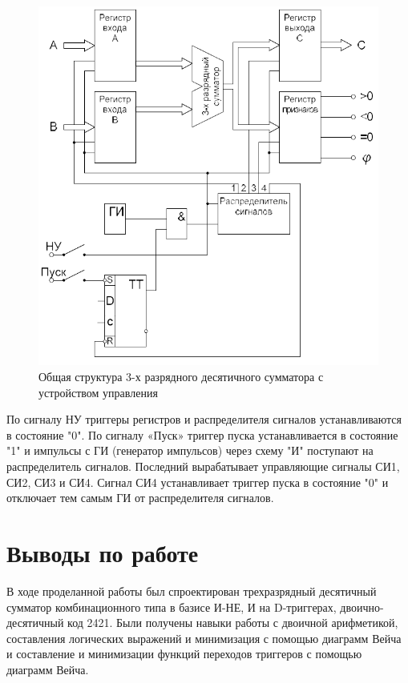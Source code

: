 \documentclass[a4paper,14pt]{article}
\begin{document}
\begin{figure}[H]
	\centering
	\includegraphics[width=1\linewidth]{images/itog_sh}
	\caption{Общая структура 3-х разрядного десятичного сумматора с устройством	управления}
	\label{fig:itog_sh}
\end{figure}

По сигналу НУ триггеры регистров и распределителя сигналов
устанавливаются в состояние "0". По сигналу «Пуск» триггер пуска
устанавливается в состояние "1" и импульсы с ГИ (генератор импульсов)
через схему "И" поступают на распределитель сигналов. Последний
вырабатывает управляющие сигналы СИ1, СИ2, СИ3 и СИ4. Сигнал СИ4
устанавливает триггер пуска в состояние "0" и отключает тем самым ГИ от
распределителя сигналов.


\section{Выводы по работе}

В ходе проделанной работы был спроектирован трехразрядный десятичный сумматор комбинационного типа в базисе И-НЕ, И на D-триггерах, двоично-десятичный код 2421. Были получены навыки работы с двоичной арифметикой, составления логических выражений и минимизация с помощью диаграмм Вейча и составление и минимизации функций переходов триггеров с помощью диаграмм Вейча.
\end{document}
